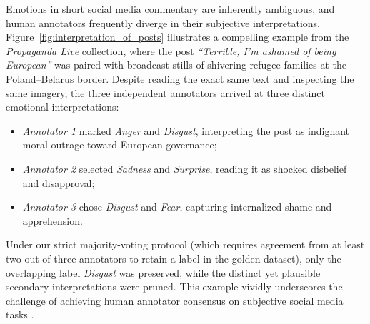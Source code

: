 Emotions in short social media commentary are inherently ambiguous, and human annotators frequently diverge in their subjective interpretations. Figure~\ref{fig:interpretation_of_posts} illustrates a compelling example from the \textit{Propaganda Live} collection, where the post \textit{``Terrible, I'm ashamed of being European''} was paired with broadcast stills of shivering refugee families at the Poland--Belarus border. Despite reading the exact same text and inspecting the same imagery, the three independent annotators arrived at three distinct emotional interpretations:
\begin{itemize}
    \item \textit{Annotator 1} marked \textit{Anger} and \textit{Disgust}, interpreting the post as indignant moral outrage toward European governance;
    \item \textit{Annotator 2} selected \textit{Sadness} and \textit{Surprise}, reading it as shocked disbelief and disapproval;
    \item \textit{Annotator 3} chose \textit{Disgust} and \textit{Fear}, capturing internalized shame and apprehension.
\end{itemize}
Under our strict majority-voting protocol (which requires agreement from at least two out of three annotators to retain a label in the golden dataset), only the overlapping label \textit{Disgust} was preserved, while the distinct yet plausible secondary interpretations were pruned. This example vividly underscores the challenge of achieving human annotator consensus on subjective social media tasks \cite{demszky2020goemotions, basile2021disagreement}.


